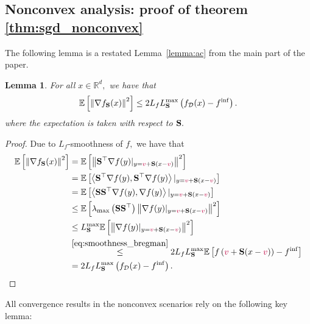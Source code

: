 \documentclass{article}
\newcommand{\shift}{{\color{purple}s}}
\newcommand{\bb}{\mathbb}
\newcommand{\lin}[1]{\left\langle #1\right\rangle}
\newcommand{\Exp}[1]{{\bb E}\left[#1\right]}
\newtheorem{lemma}{Lemma}
\theoremstyle{plain}
\newcommand{\tf}{f_{\mathcal{D}}}
\renewcommand{\shift}{{\color{purple}v}}
\newcommand{\mS}{{\bf S}}
\theoremstyle{plain}
\theoremstyle{definition}
\theoremstyle{remark}
\begin{document}
\subsection{Nonconvex analysis: proof of theorem \ref{thm:sgd_nonconvex}}
The following lemma is a restated Lemma~\ref{lemma:ac} from the main part of the paper.
\begin{lemma}\label{lemma:ac_appendix}
	For all $x\in\mathbb{R}^d,$ we have that
	\begin{equation*}
		\begin{split}
			\Exp{\left\|\nabla f_{\mS}(x)\right\|^2} & \leq 2L_fL_{\mS}^{\max} \left(\tf(x) - f^{\inf}\right).\\
		\end{split}
	\end{equation*}
	where the expectation is taken with respect to $\mS.$
\end{lemma}
\begin{proof}
	Due to $L_f$-smoothness of $f,$ we have that
	\begin{equation*}
	\begin{split}
	\Exp{\left\|\nabla f_{\mS}(x)\right\|^2}
    & = \Exp{\left\|\mS^\top \nabla f(y)|_{y=\shift+\mS(x - \shift)}\right\|^2} \\
    & = \Exp{\lin{\mS^\top \nabla f(y), \mS^\top \nabla f(y)}|_{y=\shift+\mS(x - \shift)}} \\
    & = \Exp{\lin{\mS \mS^{\top} \nabla f(y), \nabla f(y)}|_{y=\shift+\mS(x - \shift)}} \\
    & \leq  \Exp{\lambda_{\max}\left(\mS \mS^{\top}\right) \left\|\nabla f(y)|_{y=\shift+\mS(x - \shift)}\right\|^2} \\
    & \leq L_{\mS}^{\max} \Exp{\left\|\nabla f(y)|_{y=\shift+\mS(x - \shift)}\right\|^2} \\
	& \stackrel{\eqref{eq:smoothness_bregman}}{\leq} 2L_fL_{\mS}^{\max} \Exp{f\left(\shift+\mS(x-\shift)\right) - f^{\inf}} \\
	& = 2L_fL_{\mS}^{\max} \left(\tf(x) - f^{\inf}\right). \\
	\end{split}
	\end{equation*}
\end{proof}
All convergence results in the nonconvex scenarios rely on the following key lemma:
\end{document}
